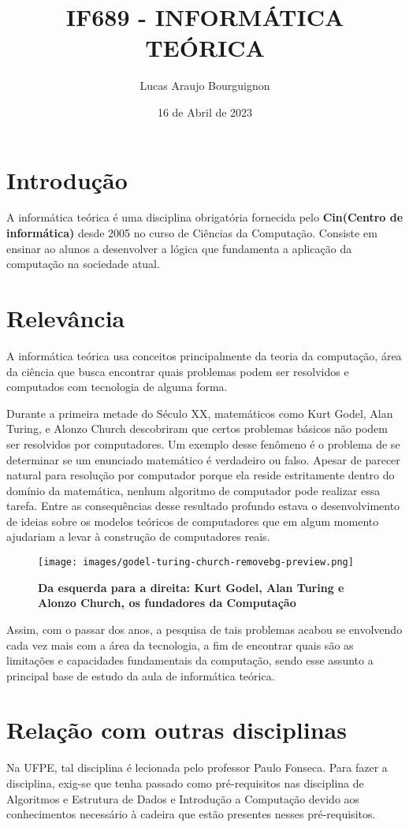 \documentclass{article}
\title{IF689 - INFORMÁTICA TEÓRICA}
\author{Lucas Araujo Bourguignon}
\date{16 de Abril de 2023}
\begin{document}
\maketitle

\section{Introdução}

A informática teórica é uma disciplina obrigatória fornecida pelo \textbf{Cin(Centro de informática)} desde 2005 no curso de Ciências da Computação. Consiste em ensinar ao alunos a desenvolver a lógica que fundamenta a aplicação da computação na sociedade atual. 

\section{Relevância}
A informática teórica usa conceitos principalmente da teoria da computação, área da ciência que busca encontrar quais problemas podem ser resolvidos e computados com tecnologia de alguma forma. 

Durante a primeira metade do Século XX, matemáticos como Kurt Godel, Alan Turing, e Alonzo Church descobriram que certos problemas básicos não podem ser resolvidos por computadores. Um exemplo desse fenômeno é o problema de se determinar se um enunciado matemático é verdadeiro ou falso. Apesar de parecer natural para resolução por computador porque ela reside estritamente dentro do domínio da matemática, nenhum algoritmo de computador pode realizar essa tarefa. Entre as consequências desse resultado profundo estava o desenvolvimento de ideias sobre os modelos teóricos de computadores que em algum momento ajudariam a levar à construção de computadores reais.\citep{Livro}




\begin{figure}[h]
    \centering
    \texttt{[image: images/godel-turing-church-removebg-preview.png]}
    \caption {\textbf{Da esquerda para a direita: Kurt Godel, Alan Turing e Alonzo Church, os fundadores da Computação}}
    \label{fig:mesh1}
    \citep{Imagem}
\end{figure}

Assim, com o passar dos anos, a pesquisa de tais problemas acabou se envolvendo cada vez mais com a área da tecnologia, a fim de encontrar quais são as limitações e capacidades fundamentais da computação, sendo esse assunto a principal base de estudo da aula de informática teórica.

\section{Relação com outras disciplinas}
Na UFPE, tal disciplina é lecionada pelo professor Paulo Fonseca. Para fazer a disciplina, exig-se que tenha passado como pré-requisitos nas disciplina de Algoritmos e Estrutura de Dados e Introdução a Computação devido aos conhecimentos necessário à cadeira que estão presentes nesses pré-requisitos.\citep{Disciplina}



\end{document}
